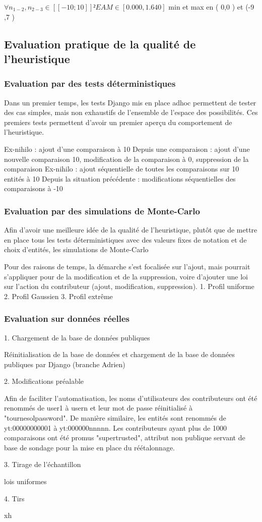$\forall{n_{1-2},n_{2-3}}\in [\![-10;10]\!]²  EAM \in [0.000,1.640 ]$ 
min et max en ( 0,0 ) et  (-9 ,7 )

\subsection{Evaluation pratique de la qualité de l'heuristique}
\subsubsection{Evaluation par des tests déterministiques}

Dans un premier temps, les tests Django mis en place adhoc permettent de tester des cas simples, mais non exhaustifs de l'ensemble de l'espace des possibilités. Ces premiers tests permettent d'avoir un premier aperçu du comportement de l'heuristique.

Ex-nihilo : ajout d'une comparaison à 10
Depuis une comparaison : ajout d'une nouvelle comparaison 10, modification de la comparaison à 0, suppression de la comparaison
Ex-nihilo : ajout séquentielle de toutes les comparaisons sur 10 entités à 10
Depuis la situation précédente : modifications séquentielles des comparaisons à -10

\subsubsection{Evaluation par des simulations de Monte-Carlo}

Afin d'avoir une meilleure idée de la qualité de l'heuristique, plutôt que de mettre en place tous les tests déterministiques avec des valeurs fixes de notation et de choix d'entités, les simulations de Monte-Carlo

Pour des raisons de temps, la démarche s'est focalisée sur l'ajout, mais pourrait s'appliquer pour de la modification et de la suppression, voire d'ajouter une loi sur l'action du contributeur (ajout, modification, suppression). 
1. Profil uniforme
2. Profil Gaussien
3. Profil extrême
\subsubsection{Evaluation sur données réelles}

1. Chargement de la base de données publiques

Réinitialisation de la base de données et chargement de la base de données publiques par Django (branche Adrien)

2. Modifications préalable

Afin de faciliter l'automatisation, les noms d'utilisateurs des contributeurs ont été renommés de user1 à usern et leur mot de passe réinitialisé à "tournesolpassword". De manière similaire, les entités sont renommés de yt:00000000001 à yt:000000nnnnn. Les contributeurs ayant plus de 1000 comparaisons ont été promus "supertrusted", attribut non publique servant de base de sondage pour la mise en place du réétalonnage.

3. Tirage de l'échantillon

lois uniformes

4. Tirs

xh

\pagebreak